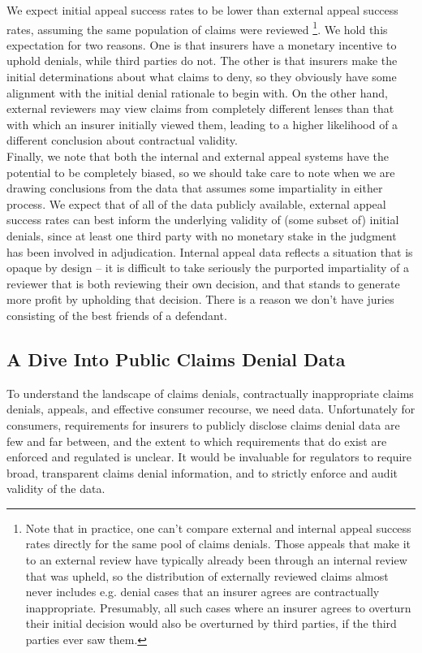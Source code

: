 \documentclass[psamsfonts]{amsart}
\theoremstyle{plain}
\theoremstyle{definition}
\theoremstyle{remark}
\begin{document}
We expect initial appeal success rates to be lower than external appeal success rates, assuming the same population of claims were reviewed \footnote{Note that in practice, one can't compare external and internal appeal success rates directly for the same pool of claims denials. Those appeals that make it to an external review have typically already been through an internal review that was upheld, so the distribution of externally reviewed claims almost never includes e.g. denial cases that an insurer agrees are contractually inappropriate. Presumably, all such cases where an insurer agrees to overturn their initial decision would also be overturned by third parties, if the third parties ever saw them.}. We hold this expectation for two reasons. One is that insurers have a monetary incentive to uphold denials, while third parties do not. The other is that insurers make the initial determinations about what claims to deny, so they obviously have some alignment with the initial denial rationale to begin with. On the other hand, external reviewers may view claims from completely different lenses than that with which an insurer initially viewed them, leading to a higher likelihood of a different conclusion about contractual validity.\\

Finally, we note that both the internal and external appeal systems have the potential to be completely biased, so we should take care to note when we are drawing conclusions from the data that assumes some impartiality in either process. We expect that of all of the data publicly available, external appeal success rates can best inform the underlying validity of (some subset of) initial denials, since at least one third party with no monetary stake in the judgment has been involved in adjudication. Internal appeal data reflects a situation that is opaque by design -- it is difficult to take seriously the purported impartiality of a reviewer that is both reviewing their own decision, and that stands to generate more profit by upholding that decision. There is a reason we don't have juries consisting of the best friends of a defendant.

\subsection{A Dive Into Public Claims Denial Data}

To understand the landscape of claims denials, contractually inappropriate claims denials, appeals, and effective consumer recourse, we need data. Unfortunately for consumers, requirements for insurers to publicly disclose claims denial data are few and far between, and the extent to which requirements that do exist are enforced and regulated is unclear. It would be invaluable for regulators to require broad, transparent claims denial information, and to strictly enforce and audit validity of the data.\\
\end{document}
